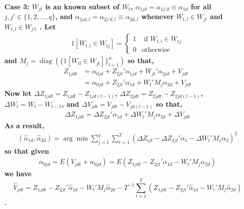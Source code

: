 \documentclass[10pt]{article}
\DeclareMathOperator{\diag}{diag}
\begin{document}
\noindent \bf Case 3: \rm $W_{jt}$ is an known subset of $W_{t}$, $\alpha_{1jd} =\alpha_{1j'd} \equiv \alpha_{1d}$ for all $j,j' \in \{1,2, \ldots,q\}$, and $\alpha_{2jd,l} = \alpha_{2j'd,l} \equiv \alpha_{2d,l}$ whenever $W_{t,l} \in W_{jt}$ and $W_{t,l} \in W_{j't}$ . Let
\begin{align*}
1[W_{t,l} \in W_{tj}] = 
\begin{cases} 
1 & \text{ if } W_{t,l} \in W_{tj} \\ 
0 & \text{otherwise}
\end{cases}
%
\end{align*}
%
and $M_j = \diag(\{1[ W_{tl} \in W_{jt}] \}_{l=1}^w)$ so that,
%
\begin{align*}
Z_{1jdt} &= \alpha_{0jd} + Z_{2jt}' \alpha_{1jd} + W_{jt}' \alpha_{2jd} + V_{jdt} \\
& =\alpha_{0jd} + Z_{2jt}' \alpha_{1d} + W_{t}'M_j \alpha_{2d} + V_{jdt}
\end{align*}
Now let $\Delta Z_{1jdt} = Z_{1jdt} - Z_{1jd(t-1)}$, $\Delta Z_{2jdt} = Z_{2jdt} - Z_{2jd(t-1)}$, $\Delta W_{t} = W_{t} - W_{t-1}$, and $\Delta V_{jdt} = V_{jdt} - V_{jd(t-1)}$ so that, 
\begin{align*} 
\Delta Z_{1jdt} =\Delta Z_{2jt}' \alpha_{1d} + \Delta W_{t}'M_j \alpha_{2d} + \Delta V_{jdt}
\end{align*}
As a result,
%
\begin{align*} 
(\hat{\alpha}_{1d},\hat{\alpha}_{2d})  = \arg \min \sum_{j=1}^q\sum_{t=1}^T\left( \Delta Z_{ijt} -  \Delta Z_{2jt}'\alpha_{1} - \Delta W_{t}'M_j\alpha_{2} \right)^2 
\end{align*}
%
\noindent so that given
\begin{align*} 
\alpha_{0jd} =  E(V_{jdt} + \alpha_{0jd}) =
E( Z_{1jdt} - Z_{2jt}'\alpha_{1d} - W_{t}'M_j\alpha_{2d}) 
\end{align*}
we have
 $$\hat{V}_{jdt} = Z_{1jdt} - Z_{2jt}'\hat{\alpha}_{1d} - W_{t}'M_j\hat{\alpha}_{2d} - T^{-1}\sum_{t=1}^T  (Z_{1jdt} - Z_{2jt}'\hat{\alpha}_{1d} - W_{t}'M_j\hat{\alpha}_{2d}) $$. 
\end{document}
